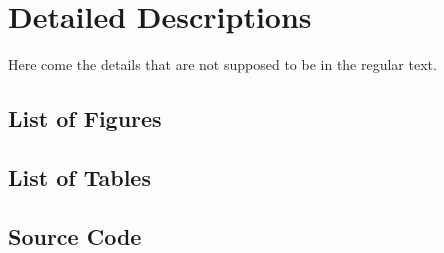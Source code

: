 \chapter{Detailed Descriptions}
\label{chapter:DetailedDescriptions}
Here come the details that are not supposed to be in the regular text.

\section{List of Figures}
	\listoffigures
\section{List of Tables}
	\listoftables
\section{Source Code}

